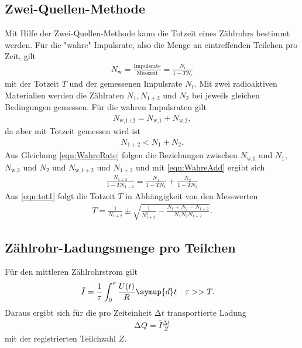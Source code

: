 \subsection{Zwei-Quellen-Methode}

Mit Hilfe der Zwei-Quellen-Methode kann die Totzeit eines Zählrohrs bestimmt
werden.
Für die "wahre" Impulsrate, also die Menge an eintreffenden Teilchen pro
Zeit, gilt
\begin{align}
  N_\text{w} = \frac{\text{Impulsrate}}{\text{Messzeit}} =
  \frac{N_\text{r}}{1-TN_\text{r}}
  \label{eqn:WahreRate}
\end{align}
mit der Totzeit $T$ und der gemessenen Impulsrate $N_\text{r}$.
Mit zwei radioaktiven Materialien werden die Zählraten
$N_1, N_{1+2}$ und $N_2$ bei jeweils gleichen Bedingungen gemessen.
Für die wahren Impulsraten gilt
\begin{align}
  N_\text{{w,}1+2} = N_\text{w,1} + N_\text{w,2},
  \label{eqn:WahreAdd}
\end{align}
da aber mit Totzeit gemessen wird ist
\begin{align}
  N_{1+2} < N_1 + N_2.
\end{align}
Aus Gleichung \eqref{eqn:WahreRate} folgen die Beziehungen zwischen
$N_\text{w,1}$ und $N_1$, $N_\text{w,2}$ und $N_2$ und
$N_{\text{w,}1+2}$ und $N_{1+2}$
und mit \eqref{eqn:WahreAdd} ergibt sich
\begin{align}
  \frac{N_{1+2}}{1-TN_{1+2}} = \frac{N_1}{1-TN_1} + \frac{N_2}{1-TN_2}
  \label{eqn:tot1}
\end{align}
Aus \eqref{eqn:tot1} folgt die Totzeit $T$ in Abhängigkeit von den Messwerten
\begin{align}
  T = \frac{1}{N_{1+2}} \pm \sqrt{\frac{1}{N_{1+2}^2}-\frac{N_1 + N_2 - N_{1+2}}{N_1 N_2 N_{1+2}}}.
\end{align}

\subsection{Zählrohr-Ladungsmenge pro Teilchen}

Für den mittleren Zählrohrstrom gilt
\begin{align}
  & \bar{I} = \frac{1}{\tau} \int_{0}^{\tau} \frac{U(t)}{R} \symup{d}t & & \tau >> T.
\end{align}
Daraus ergibt sich für die pro Zeiteinheit $\increment t$ transportierte Ladung
\begin{align}
  \increment Q = \bar{I} \frac{\increment t}{Z}  
\end{align}
mit der registrierten Teilchzahl $Z$.
